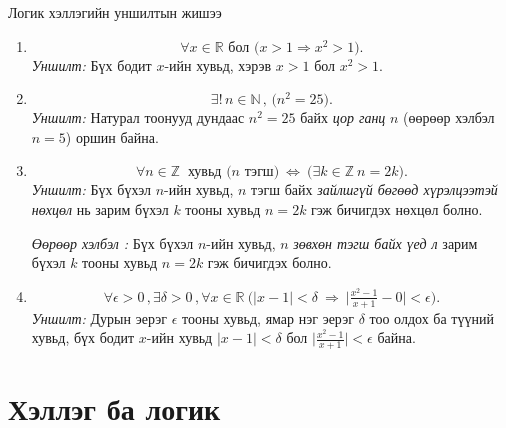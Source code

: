 \begin{example} Логик хэллэгийн уншилтын жишээ
  \begin{enumerate} 
      \item
\[
\forall x\in\mathbb{R} \text{ бол } \big( x>1  \Rightarrow  x^2>1 \big).
\]
\textit{Уншилт:} Бүх бодит \(x\)-ийн хувьд, хэрэв \(x>1\) бол \(x^2>1\).\par\medskip
      \item \[
\exists!\,n\in\mathbb{N}\, , \,\big( n^2=25\big).
\]
\textit{Уншилт:} Натурал тоонууд дундаас \(n^2=25\) байх \emph{цор ганц} \(n\) (өөрөөр хэлбэл \(n=5\)) оршин байна.\par\medskip
      \item\[
\forall n\in\mathbb{Z}\ \text{ хувьд } \big(n \text{ тэгш}\big)\ \Leftrightarrow\ \big(\exists k\in\mathbb{Z}\ n=2k\big).
\]
\textit{Уншилт:} Бүх бүхэл \(n\)-ийн хувьд, \(n\) тэгш байх \emph{зайлшгүй бөгөөд хүрэлцээтэй нөхцөл} нь зарим бүхэл \(k\) тооны хувьд \(n=2k\) гэж бичигдэх нөхцөл болно.\par\medskip
\textit{Өөрөөр хэлбэл :} Бүх бүхэл \(n\)-ийн хувьд, \(n\)  \emph{зөвхөн тэгш байх үед л} зарим бүхэл \(k\) тооны хувьд \(n=2k\) гэж бичигдэх болно.\par\medskip
      \item \[
\forall \epsilon>0\, ,  \exists \delta>0\,  , \forall x\in\mathbb{R}\ 
\Big(|x-1|<\delta\ \Rightarrow\ \big|\tfrac{x^2-1}{x+1}-0\big|<\epsilon\Big).
\]
\textit{Уншилт:} Дурын эерэг \(\epsilon\) тооны хувьд, ямар нэг эерэг \(\delta\) тоо олдох ба түүний хувьд, бүх бодит \(x\)-ийн хувьд \(|x-1|<\delta\) бол
\(\big|\frac{x^2-1}{x+1}\big|<\epsilon\) байна.\par\medskip
  \end{enumerate}  
\end{example}
\newpage
\section{Хэллэг ба логик}
